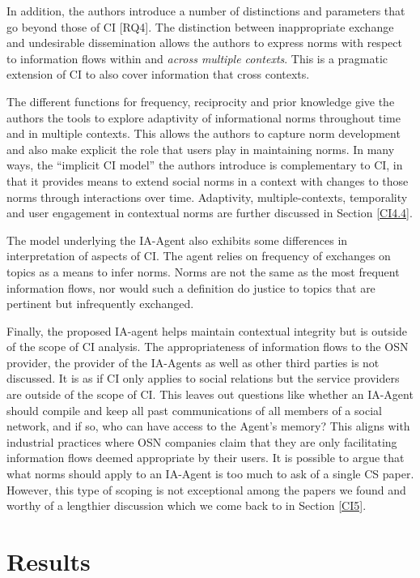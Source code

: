 \documentclass[../thesis.tex]{subfiles}
\begin{document}
In addition, the authors introduce a number of distinctions and
parameters that go beyond those of CI [RQ4]. The distinction between
inappropriate exchange and undesirable dissemination allows the authors
to express norms with respect to information flows within and
\textit{across multiple contexts}. This is a pragmatic extension of CI
to also cover information that cross contexts. 

The different functions for frequency, reciprocity and prior knowledge
give the authors the tools to explore adaptivity of informational norms
throughout time and in multiple contexts. This allows the authors to
capture norm development and also make explicit the role that users
play in maintaining norms. In many ways, the
``implicit CI model'' the authors
introduce is complementary to CI, in that it provides means to extend
social norms in a context with changes to those norms through
interactions over time. Adaptivity, multiple-contexts, temporality and
user engagement in contextual norms are further discussed in Section
\ref{CI4.4}.

The model underlying the IA-Agent also exhibits some differences in
interpretation of aspects of CI. The agent relies on frequency of
exchanges on topics as a means to infer norms. Norms are not the same
as the most frequent information flows, nor would such a definition do
justice to topics that are pertinent but infrequently exchanged. 

Finally, the proposed IA-agent helps maintain contextual integrity but
is outside of the scope of CI analysis. The appropriateness of
information flows to the OSN provider, the provider of the IA-Agents as
well as other third parties is not discussed. It is as if CI only
applies to social relations but the service providers are outside of
the scope of CI. This leaves out questions like whether an IA-Agent
should compile and keep all past communications of all members of a
social network, and if so, who can have access to the
Agent's memory? This aligns with industrial practices
where OSN companies claim that they are only facilitating information
flows deemed appropriate by their users. It is possible to argue that
what norms should apply to an IA-Agent is too much to ask of a single
CS paper. However, this type of scoping is not exceptional among the
papers we found and worthy of a lengthier discussion which we come back
to in Section \ref{CI5}.

\section{Results}
\label{CI4} 
\end{document}
